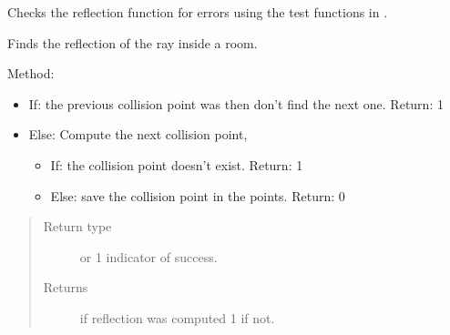 \documentclass[letterpaper,10pt,english]{sphinxmanual}
\begin{document}
\begin{fulllineitems}
\begin{fulllineitems}
\begin{quote}
\begin{description}
\end{description}\end{quote}

\end{fulllineitems}


\begin{fulllineitems}
\label{\detokenize{index:Rays.Ray.raytest}}
Checks the reflection function for errors using the test     functions in {\hyperref[\detokenize{index:module-reflection}]{}}.

\end{fulllineitems}


\begin{fulllineitems}
\label{\detokenize{index:Rays.Ray.reflect_calc}}
Finds the reflection of the ray inside a room.

Method:
\begin{itemize}
\item {} 
If: the previous collision point was  then don’t find the     next one. Return: 1

\item {} 
Else: Compute the next collision point,
\begin{itemize}
\item {} 
If: the collision point doesn’t exist. Return: 1

\item {} 
Else:  save the collision point in the {\hyperref[\detokenize{index:Rays.Ray}]{}} points.       Return: 0

\end{itemize}

\end{itemize}
\begin{quote}\begin{description}
\item[{Return type}]  or 1 indicator of success.

\item[{Returns}]  if  reflection was computed 1 if not.

\end{description}\end{quote}

\end{fulllineitems}


\end{fulllineitems}
\end{document}
